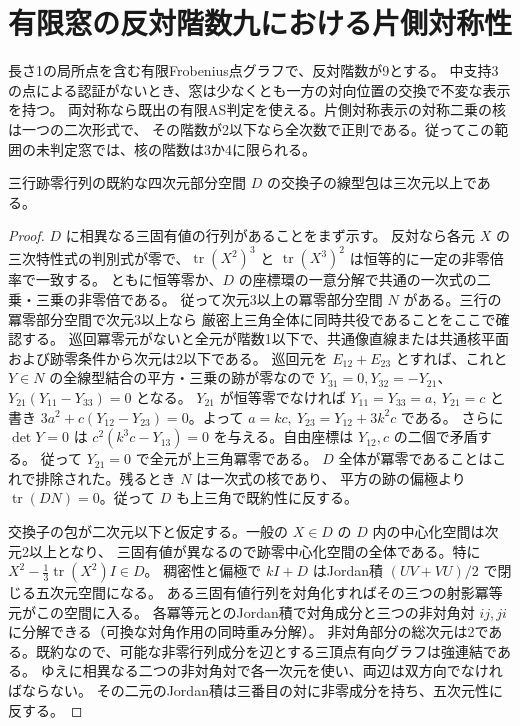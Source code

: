 \section{有限窓の反対階数九における片側対称性}
\label{sec:rank-nine-finite-symmetry}
\begin{theorem}\label{thm:rank-nine-finite-symmetry}
長さ1の局所点を含む有限Frobenius点グラフで、反対階数が9とする。
中支持3の点による認証がないとき、窓は少なくとも一方の対向位置の交換で不変な表示を持つ。
両対称なら既出の有限AS判定を使える。片側対称表示の対称二乗の核は一つの二次形式で、
その階数が2以下なら全次数で正則である。従ってこの範囲の未判定窓では、核の階数は3か4に限られる。
\end{theorem}

\begin{lemma}\label{lem:irreducible-four-plane-brackets}
三行跡零行列の既約な四次元部分空間 $D$ の交換子の線型包は三次元以上である。
\end{lemma}
\begin{proof}
$D$ に相異なる三固有値の行列があることをまず示す。
反対なら各元 $X$ の三次特性式の判別式が零で、$\operatorname{tr}(X^2)^3$ と
$\operatorname{tr}(X^3)^2$ は恒等的に一定の非零倍率で一致する。
ともに恒等零か、$D$ の座標環の一意分解で共通の一次式の二乗・三乗の非零倍である。
従って次元3以上の冪零部分空間 $N$ がある。三行の冪零部分空間で次元3以上なら
厳密上三角全体に同時共役であることをここで確認する。
巡回冪零元がないと全元が階数1以下で、共通像直線または共通核平面および跡零条件から次元は2以下である。
巡回元を $E_{12}+E_{23}$ とすれば、これと $Y\in N$ の全線型結合の平方・三乗の跡が零なので
$Y_{31}=0,Y_{32}=-Y_{21}$、$Y_{21}(Y_{11}-Y_{33})=0$ となる。
$Y_{21}$ が恒等零でなければ $Y_{11}=Y_{33}=a,\ Y_{21}=c$ と書き
$3a^2+c(Y_{12}-Y_{23})=0$。よって $a=kc,\ Y_{23}=Y_{12}+3k^2c$ である。
さらに $\det Y=0$ は $c^2(k^3c-Y_{13})=0$ を与える。自由座標は $Y_{12},c$ の二個で矛盾する。
従って $Y_{21}=0$ で全元が上三角冪零である。
$D$ 全体が冪零であることはこれで排除された。残るとき $N$ は一次式の核であり、
平方の跡の偏極より $\operatorname{tr}(D N)=0$。従って $D$ も上三角で既約性に反する。

交換子の包が二次元以下と仮定する。一般の $X\in D$ の $D$ 内の中心化空間は次元2以上となり、
三固有値が異なるので跡零中心化空間の全体である。特に $X^2-\frac13\operatorname{tr}(X^2)I\in D$。
稠密性と偏極で $k I+D$ はJordan積 $(UV+VU)/2$ で閉じる五次元空間になる。
ある三固有値行列を対角化すればその三つの射影冪等元がこの空間に入る。
各冪等元とのJordan積で対角成分と三つの非対角対 $ij,ji$ に分解できる（可換な対角作用の同時重み分解）。
非対角部分の総次元は2である。既約なので、可能な非零行列成分を辺とする三頂点有向グラフは強連結である。
ゆえに相異なる二つの非対角対で各一次元を使い、両辺は双方向でなければならない。
その二元のJordan積は三番目の対に非零成分を持ち、五次元性に反する。
\end{proof}

